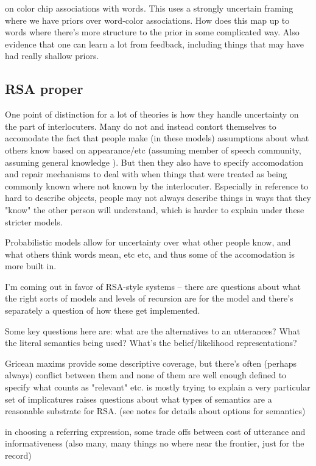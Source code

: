 \documentclass[]{article}
\begin{document}
\cite{murthy2022} on color chip associations with words. This uses a strongly uncertain framing where we have priors over word-color associations. How does this map up to words where there's more structure to the prior in some complicated way. Also evidence that one can learn a lot from feedback, including things that may have had really shallow priors. 
\subsection{RSA proper}
One point of distinction for a lot of theories is how they handle uncertainty on the part of interlocuters. Many do not and instead contort themselves to accomodate the fact that people make (in these models) assumptions about what others know based on appearance/etc (assuming member of speech community, assuming general knowledge ). But then they also have to specify accomodation and repair mechanisms to deal with when things that were treated as being commonly known where not known by the interlocuter. Especially in reference to hard to describe objects, people may not always describe things in ways that they "know" the other person will understand, which is harder to explain under these stricter models. 

Probabilistic models allow for uncertainty over what other people know, and what others think words mean, etc etc, and thus some of the accomodation is more built in. 

I'm coming out in favor of RSA-style systems -- there are questions about what the right sorts of models and levels of recursion are for the model and there's separately a question of how these get implemented. 

Some key questions here are: what are the alternatives to an utterances? What the literal semantics being used? What's the belief/likelihood representations? 

Gricean maxims provide some descriptive coverage, but there's often (perhaps always) conflict between them and none of them are well enough defined to specify what counts as "relevant" etc. 
\cite{bergen} is mostly trying to explain a very particular set of implicatures raises questions about what types of semantics are a reasonable substrate for RSA. (see notes for details about options for semantics) 

\cite{degen20200406} in choosing a referring expression, some trade offs between cost of utterance and informativeness (also many, many things no where near the frontier, just for the record) 
\end{document}
